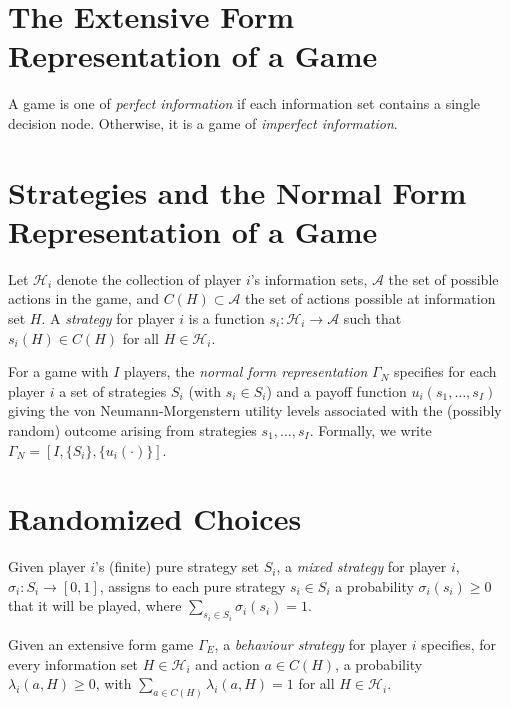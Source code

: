 \addtocounter{section}{1}

\addtocounter{section}{1}


\section{The Extensive Form Representation of a Game}

\begin{defn}
    A game is one of \emph{perfect information} if each information set contains a single decision node. Otherwise, it is a game of \emph{imperfect information}.
\end{defn}


\section{Strategies and the Normal Form Representation of a Game}

\begin{defn}
    Let $\mathscr{H}_i$ denote the collection of player $i$'s information sets, $\mathscr{A}$ the set of possible actions in the game, and $C(H) \subset \mathscr{A}$ the set of actions possible at information set $H$. A \emph{strategy} for player $i$ is a function $s_i : \mathscr{H}_i \rightarrow \mathscr{A}$ such that $s_i(H) \in C(H)$ for all $H \in \mathscr{H}_i$.
\end{defn}

\begin{defn}
    For a game with $I$ players, the \emph{normal form representation} $\Gamma_N$ specifies for each player $i$ a set of strategies $S_i$ (with $s_i \in S_i$) and a payoff function $u_i(s_1, \dots, s_I)$ giving the von Neumann-Morgenstern utility levels associated with the (possibly random) outcome arising from strategies $s_1, \dots, s_I$. Formally, we write $\Gamma_N = [I, \{S_i\}, \{u_i(\cdot)\}]$.
\end{defn}


\section{Randomized Choices}

\begin{defn}
    Given player $i$'s (finite) pure strategy set $S_i$, a \emph{mixed strategy} for player $i$, $\sigma_i : S_i \rightarrow [0, 1]$, assigns to each pure strategy $s_i \in S_i$ a probability $\sigma_i(s_i) \geq 0$ that it will be played, where $\sum_{s_i \in S_i} \sigma_i(s_i) = 1$.
\end{defn}

\begin{defn}
    Given an extensive form game $\Gamma_E$, a \emph{behaviour strategy} for player $i$ specifies, for every information set $H \in \mathscr{H}_i$ and action $a \in C(H)$, a probability $\lambda_i(a, H) \geq 0$, with $\sum_{a \in C(H)} \lambda_i(a, H) = 1$ for all $H \in \mathscr{H}_i$.
\end{defn}
